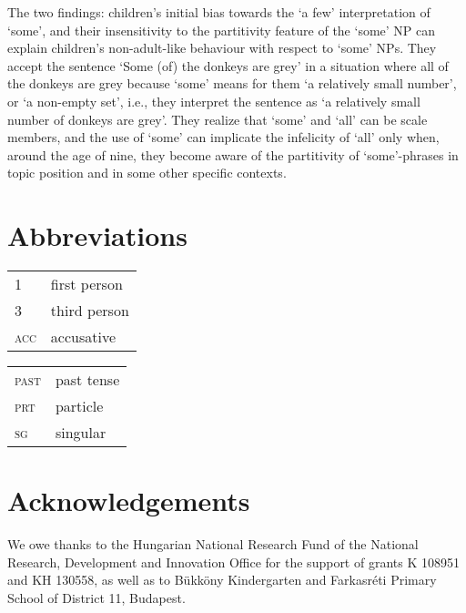 \documentclass[output=paper]{langscibook}
\begin{document}
The two findings: children's initial bias towards the `a few' interpretation of `some', and their insensitivity to the partitivity feature of the `some' NP can explain children's non-adult-like behaviour with respect to `some' NPs. They accept the sentence `Some (of) the donkeys are grey' in a situation where all of the donkeys are grey because `some' means for them `a relatively small number', or `a non-empty set', i.e., they interpret the sentence as `a relatively small number of donkeys are grey'. They realize that `some' and `all' can be scale members, and the use of `some' can implicate the infelicity of `all' only when, around the age of nine, they become aware of the partitivity of `some'-phrases in topic position and in some other specific contexts. 


\section*{Abbreviations}

\begin{tabularx}{.5\textwidth}{@{}lX@{}}
\textsc{1}&{first person}\\
\textsc{3}&{third person}\\
\textsc{acc}&{accusative}\\
\end{tabularx}%
\begin{tabularx}{.5\textwidth}{@{}lX@{}}
\textsc{past}&{past tense}\\
\textsc{prt}&{particle}\\
\textsc{sg}&{singular}\\
\end{tabularx}

\section*{Acknowledgements}
We owe thanks to the Hungarian National Research Fund of the National Research, Development and Innovation Office for the support of grants K 108951 and KH 130558, as well as to Bükköny Kindergarten and Farkasréti Primary School of District 11, Budapest.

{\sloppy\printbibliography[heading=subbibliography,notkeyword=this]}
\end{document}

